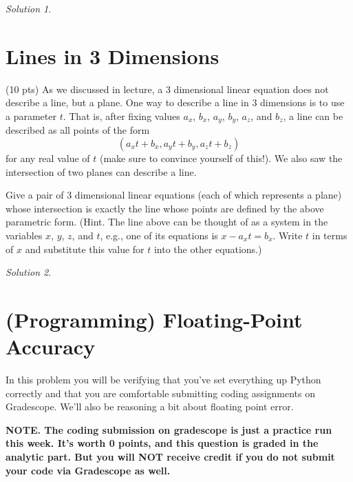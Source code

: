 \documentclass{article}
\theoremstyle{remark}
\newtheorem*{solution}{Solution}
\begin{document}
\begin{solution}
\end{solution}

\pagebreak
\section{Lines in 3 Dimensions}

(10 pts) As we discussed in lecture, a 3 dimensional linear equation does not describe a line, but a plane.
One way to describe a line in 3 dimensions is to use a parameter $t$.
That is, after fixing values $a_x$, $b_x$, $a_y$, $b_y$, $a_z$, and $b_z$, a line can be described as all points of the form
\begin{displaymath}
  (a_xt + b_x, a_yt + b_y, a_zt + b_z)
\end{displaymath}
for any real value of $t$ (make sure to convince yourself of this!).
We also saw the intersection of two planes can describe a line.

Give a pair of 3 dimensional linear equations (each of which represents a plane) whose intersection is exactly the line whose points are defined by the above parametric form. (Hint. The line above can be thought of as a system in the variables $x$, $y$, $z$, and $t$, e.g., one of its equations is $x - a_xt = b_x$. Write $t$ in terms of $x$ and substitute this value for $t$ into the other equations.)

\begin{solution}
\end{solution}

\pagebreak
\section{(Programming) Floating-Point Accuracy}

In this problem you will be verifying that you've set everything up Python correctly and that you are comfortable submitting coding assignments on Gradescope.
We'll also be reasoning a bit about floating point error.

\textbf{NOTE. The coding submission on gradescope is just a practice run this week. It's worth 0 points, and this question is graded in the analytic part. But you will NOT receive credit if you do not submit your code via Gradescope as well.}
\end{document}
